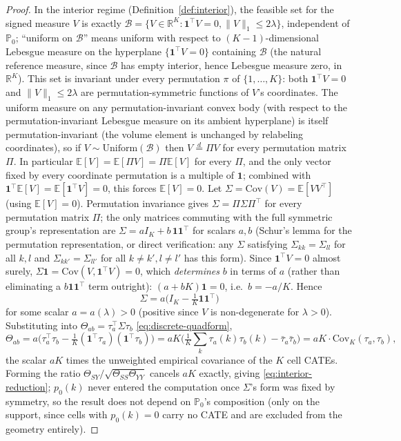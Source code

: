 \documentclass[11pt]{article}
\theoremstyle{plain}
\theoremstyle{definition}
\theoremstyle{remark}
\newcommand{\E}{\mathbb{E}}
\newcommand{\PP}{\mathbb{P}}
\newcommand{\R}{\mathbb{R}}
\newcommand{\cB}{\mathcal{B}}
\newcommand{\Cov}{\mathrm{Cov}}
\begin{document}
\begin{proof}
In the interior regime (Definition~\ref{def:interior}), the feasible set for the
signed measure $V$ is exactly $\cB=\{V\in\R^K:\mathbf1^\top V=0,\|V\|_1\le2\lambda\}$,
independent of $\PP_0$; ``uniform on $\cB$'' means uniform with respect to
$(K{-}1)$-dimensional Lebesgue measure on the hyperplane $\{\mathbf1^\top V=0\}$
containing $\cB$ (the natural reference measure, since $\cB$ has empty interior, hence
Lebesgue measure zero, in $\R^K$). This set is invariant under every permutation
$\pi$ of $\{1,\dots,K\}$: both $\mathbf1^\top V=0$ and $\|V\|_1\le2\lambda$ are
permutation-symmetric functions of $V$'s coordinates. The uniform measure on any
permutation-invariant convex body (with respect to the permutation-invariant
Lebesgue measure on its ambient hyperplane) is itself permutation-invariant (the
volume element is unchanged by relabeling coordinates), so if $V\sim\mathrm{Uniform}(\cB)$
then $V\stackrel{d}{=}\Pi V$ for every permutation matrix $\Pi$. In particular
$\E[V]=\E[\Pi V]=\Pi\E[V]$ for every $\Pi$, and the only vector fixed by every
coordinate permutation is a multiple of $\mathbf1$; combined with $\mathbf1^\top
\E[V]=\E[\mathbf1^\top V]=0$, this forces $\E[V]=0$. Let $\Sigma=\Cov(V)=\E[VV^\top]$
(using $\E[V]=0$). Permutation invariance gives $\Sigma=\Pi\Sigma\Pi^\top$ for every
permutation matrix $\Pi$; the only matrices commuting with the full symmetric group's
representation are $\Sigma=aI_K+b\,\mathbf1\mathbf1^\top$ for scalars $a,b$ (Schur's
lemma for the permutation representation, or direct verification: any $\Sigma$
satisfying $\Sigma_{kk}=\Sigma_{ll}$ for all $k,l$ and $\Sigma_{kk'}=\Sigma_{ll'}$ for
all $k\ne k',l\ne l'$ has this form). Since $\mathbf1^\top V=0$ almost surely,
$\Sigma\mathbf1=\Cov(V,\mathbf1^\top V)=0$, which \emph{determines} $b$ in terms of
$a$ (rather than eliminating a $b\mathbf1\mathbf1^\top$ term outright): $(a+bK)\mathbf1=0$, i.e.\
$b=-a/K$. Hence
\[
    \Sigma = a\Big(I_K-\tfrac1K\mathbf1\mathbf1^\top\Big)
\]
for some scalar $a=a(\lambda)>0$ (positive since $V$ is non-degenerate for
$\lambda>0$). Substituting into $\Theta_{ab}=\tau_a^\top\Sigma\tau_b$
\eqref{eq:discrete-quadform},
\[
    \Theta_{ab} = a\Big(\tau_a^\top\tau_b - \tfrac1K(\mathbf1^\top\tau_a)(\mathbf1^\top\tau_b)\Big)
    = aK\Big(\tfrac1K\textstyle\sum_k\tau_a(k)\tau_b(k) - \bar\tau_a\bar\tau_b\Big)
    = aK\cdot\mathrm{Cov}_K(\tau_a,\tau_b),
\]
the scalar $aK$ times the unweighted empirical covariance of the $K$ cell CATEs.
Forming the ratio $\Theta_{SY}/\sqrt{\Theta_{SS}\Theta_{YY}}$ cancels $aK$ exactly,
giving \eqref{eq:interior-reduction}; $p_0(k)$ never entered the computation once
$\Sigma$'s form was fixed by symmetry, so the result does not depend on $\PP_0$'s
composition (only on the support, since cells with $p_0(k)=0$ carry no CATE and are
excluded from the geometry entirely).
\end{proof}
\end{document}

